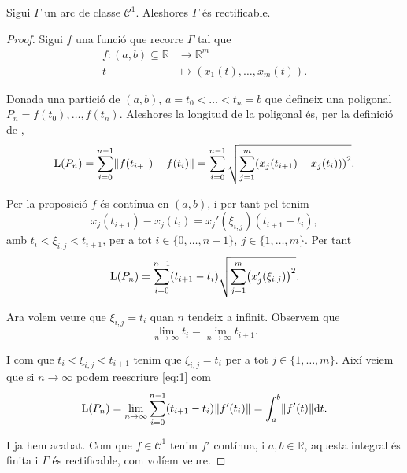 \documentclass[../Apunts.tex]{subfiles}
\begin{document}
	\begin{proposition}
		Sigui \(\Gamma\) un arc de classe \(\mathcal{C}^{1}\). Aleshores \(\Gamma\) és rectificable.
		\begin{proof}
			Sigui \(f\) una funció que recorre \(\Gamma\) tal que
			\begin{align*}
			f\colon(a,b)\subseteq\mathbb{R}&\longrightarrow\mathbb{R}^{m}\\
			t&\longmapsto(x_{1}(t),\dots,x_{m}(t)).
			\end{align*}
			
			Donada una partició de \((a,b)\), \(a=t_{0}<\dots<t_{n}=b\) que defineix una poligonal \(P_{n}=f(t_{0}),\dots,f(t_{n})\). Aleshores la longitud de la poligonal  és, per la definició de ,
			\[\Long(P_n)=\sum_{i=0}^{n-1}\norm{f(t_{i+1})-f(t_{i})}=\sum_{i=0}^{n-1}\sqrt{\sum_{j=1}^{m}\left(x_{j}(t_{i+1})-x_{j}(t_{i}))\right)^{2}}.\]
			
			Per la proposició  \(f\) és contínua en \((a,b)\), i per tant pel  tenim
			\[x_{j}(t_{i+1})-x_{j}(t_{i})=x_{j}'(\xi_{i,j})(t_{i+1}-t_{i}),\]
			amb \(t_{i}<\xi_{i,j}<t_{i+1}\), per a tot \(i\in\{0,\dots,n-1\},\ j\in\{1,\dots,m\}\). Per tant
			\begin{equation}\label{eq:1}
			\Long(P_{n})=\sum_{i=0}^{n-1}(t_{i+1}-t_{i})\sqrt{\sum_{j=1}^{m}\left(x_{j}'(\xi_{i,j})\right)^2}.
			\end{equation}
			
			Ara volem veure que \(\xi_{i,j}=t_{i}\) quan \(n\) tendeix a infinit. Observem que
			\[\lim_{n\to\infty}t_{i}=\lim_{n\to\infty}t_{i+1}.\]
			
			I com que \(t_{i}<\xi_{i,j}<t_{i+1}\) tenim que \(\xi_{i,j}=t_{i}\) per a tot \(j\in\{1,\dots,m\}\). Així veiem que si \(n\to\infty\) podem reescriure \eqref{eq:1} com
			\begin{displaymath}
			\Long(P_{n})=\lim_{n\to\infty}\sum_{i=0}^{n-1}(t_{i+1}-t_{i})\norm{f'(t_{i})}=\int_{a}^{b}\norm{f'(t)}\diff t.
			\end{displaymath}
			
			I ja hem acabat. Com que \(f\in\mathcal{C}^{1}\) tenim \(f'\) contínua, i \(a,b\in\mathbb{R}\), aquesta integral és finita i \(\Gamma\) és rectificable, com volíem veure.
		\end{proof}
	\end{proposition}
\end{document}
